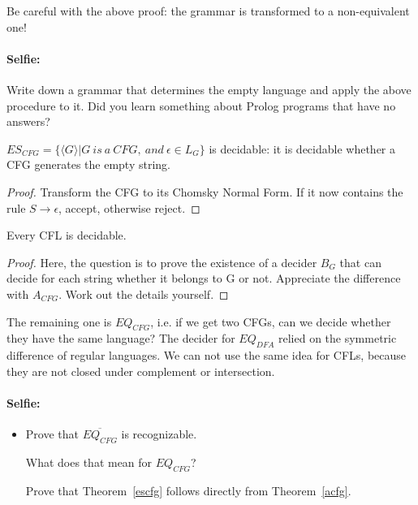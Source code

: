 Be careful with the above proof: the grammar is transformed to a
non-equivalent one!


\paragraph{Selfie:}
Write down a grammar that determines the empty language and apply the
above procedure to it. Did you learn something about Prolog programs
that have no answers?

\begin{theorem} \label{escfg}
$ES_{CFG} = \{\langle G \rangle|G~is~a~CFG,~and~\epsilon \in L_G\}$ is
    decidable: it is decidable whether a CFG generates the empty string.
\end{theorem}
\begin{proof}
Transform the CFG to its Chomsky Normal Form. If it now contains the
rule $S \rightarrow \epsilon$, accept, otherwise reject.
\end{proof}

\begin{theorem}
Every CFL is decidable.
\end{theorem}
\begin{proof}
Here, the question is to prove the existence of a decider $B_G$ that
can decide for each string whether it belongs to G or not. Appreciate
the difference with $A_{CFG}$. Work out the details yourself.
\end{proof}

The remaining one is $EQ_{CFG}$, i.e. if we get two CFGs, can we
decide whether they have the same language? The decider for $EQ_{DFA}$
relied on the symmetric difference of regular languages. We can not
use the same idea for CFLs, because they are not closed under
complement or intersection.

\paragraph{Selfie:}
\begin{itemize}
\item[]
Prove that $\overline{EQ_{CFG}}$ is recognizable.

What does that mean for $EQ_{CFG}$?

Prove that Theorem~\ref{escfg} follows directly from Theorem~\ref{acfg}.
\end{itemize}



